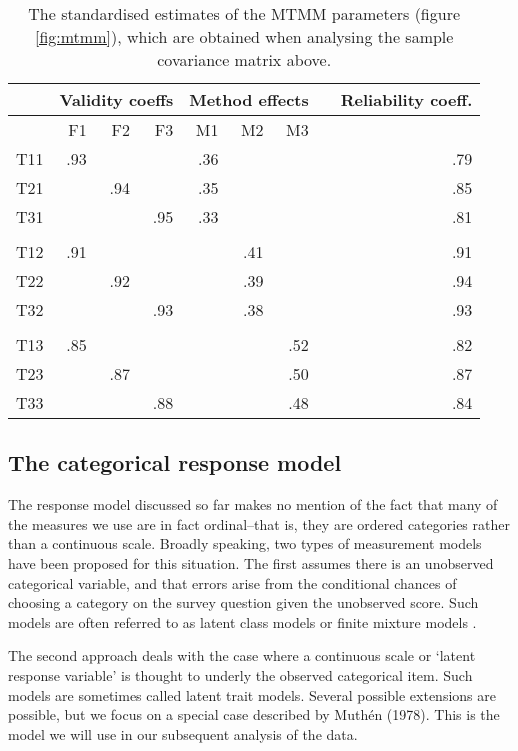 \documentclass[a4paper,12pt]{article}
\begin{document}
\begin{table}\centering\caption{The standardised estimates of the MTMM parameters (figure \ref{fig:mtmm}), which are obtained when analysing the sample covariance matrix above.\label{tab:mtmm_results}}
\begin{tabular}{lrrrrrrrr}\hline
 &   \multicolumn{3}{c}{Validity coeffs} & \multicolumn{3}{c}{Method effects} &  & Reliability coeff.\\ 
 \hline
    & F1 & F2 & F3 & M1 & M2 & M3 \\ 
T11   & .93 &  &  & .36 &  &  &  & .79 \\ 
T21   &  & .94 &  & .35 &  &  &  & .85 \\ 
T31   &  &  & .95 & .33 &  &  &  & .81 \\ 
 \\ 
T12   & .91 &  &  &  & .41 &  &  & .91 \\ 
T22   &  & .92 &  &  & .39 &  &  & .94     \\ 
T32   &  &  & .93 &  & .38 &  &  & .93 \\ 
 \\ 
T13   & .85 &  &  &  &  & .52 &  & .82 \\ 
T23   &  & .87 &  &  &  & .50 &  & .87\\ 
T33   &  &  & .88 &  &  & .48 &  & .84  \\
\hline
\end{tabular}
\end{table}

\subsection{The categorical response model}

The response model discussed so far makes no mention of the fact that many of the measures we use are in fact ordinal--that is, they are ordered categories rather than a continuous scale. 
Broadly speaking, two types of measurement models have been proposed for this situation. The first assumes there is an unobserved categorical variable, and that errors arise from the conditional chances of choosing a category on the survey question given the unobserved score. Such models are often referred to as latent class models or finite mixture models \cite{lazarsfeld_latent_1968}.

The second approach deals with the case where a continuous scale or `latent response variable' is thought to underly the observed categorical item. Such models are sometimes called latent trait models. Several possible extensions are possible, but we focus on a special case described by Muth\'en (1978). This is the model we will use in our subsequent analysis of the data.
\end{document}
